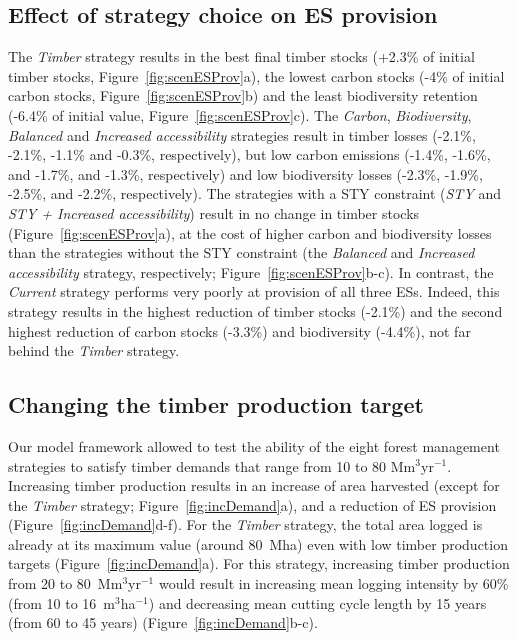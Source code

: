 \documentclass[12pt]{article}
\begin{document}
\subsection*{Effect of strategy choice on ES provision}

The \textit{Timber} strategy results in the best final timber stocks (+2.3\% of initial timber stocks, Figure~\ref{fig:scenESProv}a), the lowest carbon stocks (-4\% of initial carbon stocks, Figure~\ref{fig:scenESProv}b) and the least biodiversity retention (-6.4\% of initial value, Figure~\ref{fig:scenESProv}c). The \textit{Carbon}, \textit{Biodiversity}, \textit{Balanced} and \textit{Increased accessibility} strategies result in timber losses (-2.1\%, -2.1\%, -1.1\% and -0.3\%, respectively), but low carbon emissions (-1.4\%, -1.6\%, and -1.7\%, and -1.3\%, respectively) and low biodiversity losses (-2.3\%, -1.9\%, -2.5\%, and -2.2\%, respectively). The strategies with a STY constraint (\textit{STY} and \textit{STY + Increased accessibility}) result in no change in timber stocks (Figure~\ref{fig:scenESProv}a), at the cost of higher carbon and biodiversity losses than the strategies without the STY constraint (the \textit{Balanced} and \textit{Increased accessibility} strategy, respectively; Figure~\ref{fig:scenESProv}b-c). In contrast, the \textit{Current} strategy performs very poorly at provision of all three ESs. Indeed, this strategy results in the highest reduction of timber stocks (-2.1\%) and the second highest reduction of carbon stocks (-3.3\%) and biodiversity (-4.4\%), not far behind the \textit{Timber} strategy. 

\subsection*{Changing the timber production target}

Our model framework allowed to test the ability of the eight forest management strategies to satisfy timber demands that range from 10 to 80 Mm$^3$yr$^{-1}$. Increasing timber production results in an increase of area harvested (except for the \textit{Timber} strategy; Figure~\ref{fig:incDemand}a), and a reduction of ES provision (Figure~\ref{fig:incDemand}d-f). For the \textit{Timber} strategy, the total area logged is already at its maximum value (around 80~Mha) even with low timber production targets (Figure~\ref{fig:incDemand}a). For this strategy, increasing timber production from 20 to 80~Mm$^3$yr$^{-1}$ would result in increasing mean logging intensity by 60\% (from 10 to 16~m$^3$ha$^{-1}$) and decreasing mean cutting cycle length by 15 years (from 60 to 45 years) (Figure~\ref{fig:incDemand}b-c).
\end{document}
